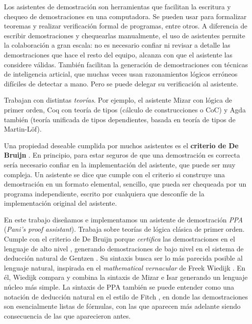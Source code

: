 Los asistentes de demostración son herramientas que facilitan la escritura y chequeo de demostraciones en una computadora. Se pueden usar para formalizar teoremas y realizar verificación formal de programas, entre otros. A diferencia de escribir demostraciones y chequearlas manualmente, el uso de asistentes permite la colaboración a gran escala: no es necesario confiar ni revisar a detalle las demostraciones que hace el resto del equipo, alcanza con que el asistente las considere válidas. También facilitan la generación de demostraciones con técnicas de inteligencia articial, que muchas veces usan razonamientos lógicos erróneos difíciles de detectar a mano. Pero se puede delegar su verificación al asistente.

Trabajan con distintas \textit{teorías}. Por ejemplo, el asistente Mizar \cite{mizar} con lógica de primer orden, Coq \cite{coq} con teoría de tipos (cálculo de construcciones o CoC) y Agda \cite{agda} también (teoría unificada de tipos dependientes, basada en teoría de tipos de Martin-Löf).

Una propiedad deseable cumplida por muchos asistentes es el \textbf{criterio de De Bruijn} \cite{freek-bruijn}. En principio, para estar seguros de que una demostración es correcta sería necesario confiar en la implementación del asistente, que puede ser muy compleja. Un asistente se dice que cumple con el criterio si construye una demostración en un formato elemental, sencillo, que pueda ser chequeada por un programa independiente, escrito por cualquiera que desconfíe de la implementación original del asistente.

En este trabajo diseñamos e implementamos un asistente de demostración
\textit{PPA} (\textit{Pani's proof assistant}). Trabaja sobre teorías de lógica
clásica de primer orden. Cumple con el criterio de De Bruijn porque
\textit{certifica} las demostraciones en el lenguaje de alto nivel \ppaLang{},
generando demostraciones de bajo nivel en el sistema de deducción natural de
Gentzen \cite{gentzen-1935}. Su sintaxis busca ser lo más parecida posible al
lenguaje natural, inspirada en el \textit{mathematical vernacular} de Freek
Wiedijk \cite{freek-mv}. En él, Wiedijk compara y combina la sintaxis de Mizar e
Isar \cite{wenzel-isar} generando un lenguaje núcleo más simple. La sintaxis de PPA también se puede entender como una notación de deducción
natural en el estilo de Fitch \cite{sep-natural-deduction}, en donde las
demostraciones son esencialmente listas de fórmulas, con las que aparecen más
adelante siendo consecuencia de las que aparecieron antes.

